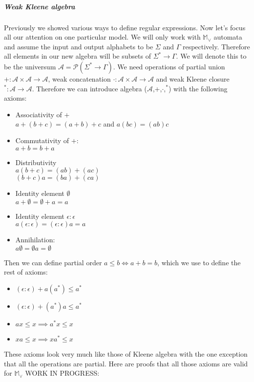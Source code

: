 \documentclass[12pt]{article}
\begin{document}
\subparagraph{ Weak Kleene algebra} Previously we showed various ways to define regular expressions. Now let's focus all our attention on one particular model. We will only work with $\mathbb{ M}_\vee$ automata and assume the input and output alphabets to be $\Sigma$ and $\Gamma$ respectively. Therefore all elements in our new algebra will be subsets of $\Sigma^* \rightarrow \Gamma$. We will denote this to be the universum $\mathcal{A} = \mathcal{P}(\Sigma^* \rightarrow \Gamma)$. We need operations of partial union $+ : \mathcal{A} \times \mathcal{A} \rightarrow \mathcal{A} $, weak concatenation $\cdot : \mathcal{A} \times \mathcal{A} \rightarrow \mathcal{A} $ and weak Kleene closure $^* : \mathcal{A} \rightarrow \mathcal{A} $. Therefore we can introduce  algebra ($\mathcal{A}$,$+$,$\cdot$,$^*$) with the following axioms:
\begin{itemize}
	\item Associativity of $+$ \\
	$a + (b + c) = (a + b) + c$ and $a(bc) = (ab)c$
	\item Commutativity of $+$: \\
	$a + b = b + a$
	\item Distributivity \\
	 $a(b + c) = (ab) + (ac)$ \\
	 $(b + c)a = (ba) + (ca)$
	 \item Identity element $\emptyset$  \\
	 $a + \emptyset = \emptyset + a = a$
	 \item Identity element $\epsilon:\epsilon$  \\
	 $a (\epsilon:\epsilon) = (\epsilon:\epsilon) a = a$  
	 \item Annihilation: \\
	  $a\emptyset = \emptyset a = \emptyset$
\end{itemize}
Then we can define partial order $a \le b \iff  a+b = b$, which we use to define the rest of axioms:
\begin{itemize}
	\item $(\epsilon:\epsilon) + a(a^*) \le a^*$ 
    \item $(\epsilon:\epsilon) + (a^*)a \le a^*$
    \item $ax \le x\implies a^*x \le x$
    \item $xa \le x\implies xa^* \le x$
\end{itemize}
These axioms look very much like those of Kleene algebra with the one exception that all the operations are partial. Here are proofs that all those axioms are valid for  $\mathbb{ M}_\vee$ WORK IN PROGRESS:
\end{document}
